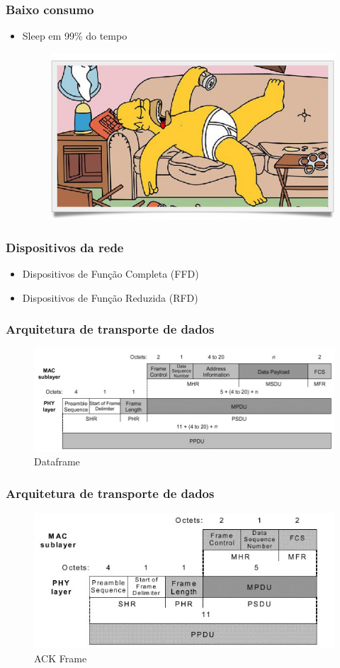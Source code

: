 \documentclass{beamer}
\begin{document}
   \frame
  {
    \frametitle{Baixo consumo}
    \begin{itemize}
	\item Sleep em 99\% do tempo
	\begin{figure}[ht!]
	  \centering
	  \includegraphics[width=.7\textwidth]{figuras/homer}
	  \label{fig:homer}
     \end{figure}
    \end{itemize}
  }

  \frame
  {
    \frametitle{Dispositivos da rede}
    \begin{itemize}
      \item Dispositivos de Função Completa (FFD)
      \item Dispositivos de Função Reduzida (RFD)
    \end{itemize}
  }

  \frame
  {
    \frametitle{Arquitetura de transporte de dados}
    \begin{figure}[ht!]
	  \centering
	  \includegraphics[width=.8\textwidth]{figuras/dataframe}
	  \caption{Dataframe}
	  \label{fig:dataframe}
    \end{figure}
  }

  \frame
  {
    \frametitle{Arquitetura de transporte de dados}
    \begin{figure}[ht!]
	  \centering
	  \includegraphics[width=.8\textwidth]{figuras/ackframe}
	  \caption{ACK Frame}
	  \label{fig:ackframe}
    \end{figure}
  }
\end{document}
